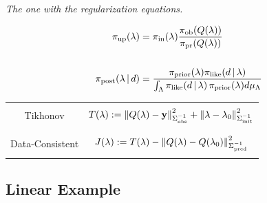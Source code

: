 \begin{frame}{\it The one with the regularization equations.}

\begin{table}[htbp]
\centering
\begin{equation*}
\begin{split}
\operatorname*{\pi_{up}}(\lambda) &= \operatorname*{\pi_{in}}(\lambda) \frac{\operatorname*{\pi_{ob}}(Q(\lambda))}{\operatorname*{\pi_{pr}}(Q(\lambda))} \\
 & \\
\operatorname*{\pi_{post}}(\lambda\,|\,d) &= \frac{\operatorname*{\pi_{prior}}(\lambda)\pi_\text{like}(d\,|\,\lambda)}{\int_{{\Lambda}} \pi_\text{like}(d\, |\, \lambda)  \operatorname*{\pi_{prior}}(\lambda) d\mu_{{\Lambda}}}
\end{split}
\end{equation*}

\bigskip
\begin{tabular}{|c|c|}
\hline
& \\
  Tikhonov & $T(\lambda):=\left\Vert Q(\lambda)-\mathbf{y}\right\Vert_{\Sigma_\text{obs}^{-1}}^2 +
      \left\Vert\lambda-\lambda_0\right\Vert_{\Sigma_\text{init}^{-1}}^2$ \\
& \\
\hline & \\
  Data-Consistent & $J(\lambda):=T(\lambda) - \left\Vert Q(\lambda)-Q(\lambda_0)\right\Vert_{\Sigma_\text{pred}^{-1}}^2$ \\
& \\
  \hline
\end{tabular}
%
%
  \label{tab:func_comparisons}
\end{table}


\end{frame}



\subsection{Linear Example}

